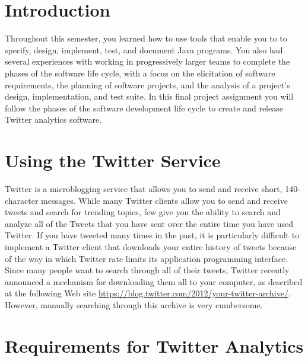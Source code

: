 

\usepackage[compact]{titlesec}



\section*{Introduction} 

Throughout this semester, you learned how to use tools that enable you to to specify, design, implement, test, and
document Java programs.  You also had several experiences with working in progressively larger teams to complete the
phases of the software life cycle, with a focus on the elicitation of software requirements, the planning of software
projects, and the analysis of a project's design, implementation, and test suite.  In this final project assignment you
will follow the phases of the software development life cycle to create and release Twitter analytics software.

\section*{Using the Twitter Service}

Twitter is a microblogging service that allows you to send and receive short, 140-character messages.  While many
Twitter clients allow you to send and receive tweets and search for trending topics, few give you the ability to search
and analyze all of the Tweets that you have sent over the entire time you have used Twitter. If you have tweeted many
times in the past, it is particularly difficult to implement a Twitter client that downloads your entire history of
tweets because of the way in which Twitter rate limits its application programming interface.  Since many people want to
search through all of their tweets, Twitter recently announced a mechanism for downloading them all to your computer, as
described at the following Web site \url{https://blog.twitter.com/2012/your-twitter-archive/}.  However, manually
searching through this archive is very cumbersome. 

\section*{Requirements for Twitter Analytics}

